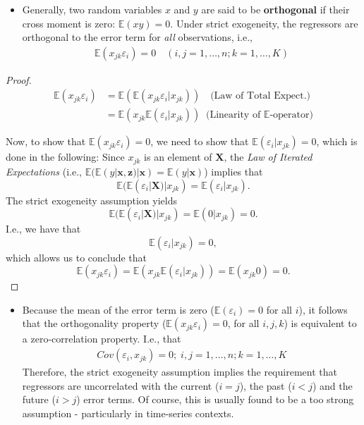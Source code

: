 \documentclass[]{book}
\providecommand{\tightlist}{%
  \setlength{\itemsep}{0pt}\setlength{\parskip}{0pt}}
\theoremstyle{definition}
\theoremstyle{definition}
\theoremstyle{definition}
\theoremstyle{remark}
\let\BeginKnitrBlock\begin \let\EndKnitrBlock\end
\begin{document}
\begin{itemize}
\tightlist
\item
  Generally, two random variables \(x\) and \(y\) are said to be
  \textbf{orthogonal} if their cross moment is zero: \(\mathbb{E}(xy)=0\). Under
  strict exogeneity, the regressors are orthogonal to the error term
  for \emph{all} observations, i.e.,
  \begin{align*}
  \mathbb{E}(x_{jk}\varepsilon_i) = 0\quad(i,j=1,\dots,n; k=1,\dots,K)
  \label{eq:c3e5}
  \end{align*}
\end{itemize}

\BeginKnitrBlock{proof}
{}\begin{align*}
      \mathbb{E}(x_{jk}\varepsilon_i) &= \mathbb{E}(\mathbb{E}(x_{jk}\varepsilon_i|x_{jk}))\quad{\text{(Law of Total Expect.)}}\\
       &= \mathbb{E}(x_{jk}\mathbb{E}(\varepsilon_i|x_{jk}))\;\;{\text{(Linearity of $\mathbb{E}$-operator)}}
\end{align*}

Now, to show that \(\mathbb{E}(x_{jk}\varepsilon_i)=0\), we need to show that \(\mathbb{E}(\varepsilon_i|x_{jk})=0\), which is done in the following:
Since \(x_{jk}\) is an element of \(\mathbf{X}\), the \emph{Law of Iterated Expectations} (i.e., \(\mathbb{E}(\mathbb{E}(y|\mathbf{x},\mathbf{z})|\mathbf{x})=\mathbb{E}(y|\mathbf{x})\))
implies that \[\mathbb{E}(\mathbb{E}(\varepsilon_i|\mathbf{X})|x_{jk})=\mathbb{E}(\varepsilon_i|x_{jk}).\] The
strict exogeneity assumption yields
\[\mathbb{E}(\mathbb{E}(\varepsilon_i|\mathbf{X})|x_{jk})=\mathbb{E}(0|x_{jk})=0.\] I.e., we have that
\[\mathbb{E}(\varepsilon_i|x_{jk})=0,\] which allows us to conclude that
\[\mathbb{E}(x_{jk}\varepsilon_i)=\mathbb{E}(x_{jk}\mathbb{E}(\varepsilon_i|x_{jk}))=\mathbb{E}(x_{jk}0)=0.\]
\EndKnitrBlock{proof}

\begin{itemize}
\tightlist
\item
  Because the mean of the error term is zero (\(\mathbb{E}(\varepsilon_i)=0\) for all
  \(i\)), it follows that the orthogonality property
  (\(\mathbb{E}(x_{jk}\varepsilon_i)=0\), for all \(i,j,k\)) is equivalent to a
  zero-correlation property. I.e., that
  \begin{align*}
    Cov(\varepsilon_i,x_{jk}) = 0;\; i,j=1,\dots,n; k=1,\dots,K
     \label{eq:c3e6}
  \end{align*}
  Therefore, the strict exogeneity assumption implies the requirement
  that regressors are uncorrelated with the current (\(i=j\)), the past
  (\(i<j\)) and the future (\(i>j\)) error terms. Of course, this is
  usually found to be a too strong assumption - particularly in
  time-series contexts.
\end{itemize}
\end{document}

